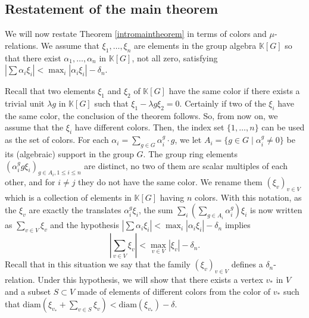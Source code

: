 \documentclass[11pt,letterpaper]{amsart}
\begin{document}
\subsection{Restatement of the main theorem\label{restate}}



We will now restate Theorem \ref{intromaintheorem} in terms of colors and $\mu$-relations. We assume that $\xi_1,\dots,\xi_n$ are elements in the group algebra $\mathbb{K} [G]$ so
that there exist $\alpha_1, \ldots, \alpha_n$ in $\mathbb{K}
[G]$, not all zero, satisfying $| \sum \alpha_i \xi_i | < \max_i | \alpha_i \xi_i | -
\delta_n$. %

Recall that two elements $\xi_1$ and $\xi_2$ of $\mathbb{K} [G]$ have the
same color if there exists a trivial unit $\lambda g$ in
$\mathbb{K} [G]$ such that $\xi_1 - \lambda g \xi_2 = 0$. Certainly if two
of the $\xi_i$ have the same color, the conclusion of the theorem follows. So, from now on, we assume that the $\xi_i$ have different colors. Then, the index set $\{ 1, \ldots, n \}$ can be used as the set of colors. For each
$\alpha_i = \sum_{g \in G} \alpha^g_i \cdot g$, we let $A_i = \{g \in G \mid
\alpha^g_i \neq 0\}$ be its (algebraic) support in the group $G$. The group
ring elements $(\alpha^g_i g \xi_i)_{g \in A_i, 1 \leq i \leq n}$ are
distinct, no two of them are scalar multiples of each other, and for $i \neq
j$ they do not have the same color. We rename them $(\xi_v)_{v \in V}$ which
is a collection of elements in $\mathbb{K} [G]$ having $n$ colors. With this notation, as the $\xi_v$ are exactly the 
translates $\alpha_i^g\xi_i$, the sum $\sum_i\left(\sum_{g\in A_i}\alpha_i^g\right)\xi_i$ is now written as $\sum_{v\in V}\xi_v$ and the hypothesis $| \sum \alpha_i \xi_i | < \max_i | \alpha_i \xi_i |
- \delta_n$ implies
$$
\left| \sum_{v \in V} \xi_v \right| < \max_{v \in V} \left| \xi_v \right| - \delta_n.
$$
Recall that in this situation we say that the family $(\xi_v)_{v \in V}$ defines a
$\delta_n$-relation. Under this hypothesis, we will show that there exists a
vertex $v_*$ in $V$ and a subset $S \subset V$ made of elements of different
colors from the color of $v_*$ such that $\mathrm{diam} (\xi_{v_*} + \sum_{v
\in S} \xi_v) < \mathrm{diam} (\xi_{v_*}) - \delta$.
\end{document}
